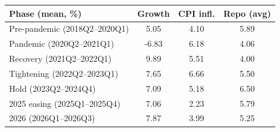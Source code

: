 \begin{tabular}{lccc}
\toprule
Phase (mean, \%) & Growth & CPI infl. & Repo (avg) \\
\midrule
Pre-pandemic (2018Q2–2020Q1) & 5.05 & 4.10 & 5.89 \\
Pandemic (2020Q2–2021Q1) & -6.83 & 6.18 & 4.06 \\
Recovery (2021Q2–2022Q1) & 9.89 & 5.51 & 4.00 \\
Tightening (2022Q2–2023Q1) & 7.65 & 6.66 & 5.50 \\
Hold (2023Q2–2024Q4) & 7.09 & 5.18 & 6.50 \\
2025 easing (2025Q1–2025Q4) & 7.06 & 2.23 & 5.79 \\
2026 (2026Q1–2026Q3) & 7.87 & 3.99 & 5.25 \\
\bottomrule
\end{tabular}
